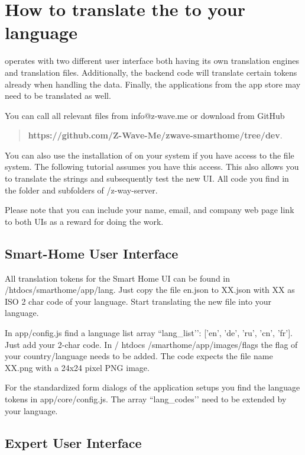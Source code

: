 \section{How to translate the \zway to your language}
\label{sec:translation}

\zway operates with two different user interface both having its own translation engines 
and translation files. Additionally, the backend code will translate certain tokens already 
when handling the data. Finally, the applications from the app store may need to be translated as well.

You can call all relevant files from info@z-wave.me or download from GitHub


\begin{quote}
\textbf{https://github.com/Z-Wave-Me/zwave-smarthome/tree/dev}.
\end{quote}

You can also use the installation of \zway on your system if you have access to the file 
system. The following tutorial assumes you have this access. This also allows you to 
translate the strings and subsequently test the new UI. All \zway code you find in the 
folder and subfolders of /z-way-server.

Please note that you can include your name, email, and company web page link to both UIs 
as a reward for doing the work. 

\subsection{Smart-Home User Interface}

All translation tokens for the Smart Home UI can be found in /htdocs/smarthome/app/lang.
Just copy the file en.json to XX.json with XX as ISO 2 char code of your language. Start 
translating the new file into your language.

In app/config.js find a language list array ``lang\_list’’: ['en', 'de', 'ru', 'cn', 'fr']. 
Just add your 2-char code. In / htdocs /smarthome/app/images/flags the flag of 
your country/language needs to be added. The code expects the file name XX.png with a 24x24 pixel PNG image.

For the standardized form dialogs of the application setups you find the language 
tokens in app/core/config.js. The array ``lang\_codes’’ need to be extended by your language.

\subsection{Expert User Interface}

